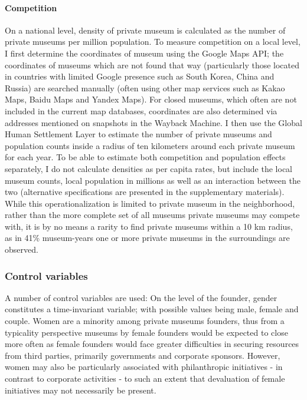 \documentclass[12pt]{article}
\begin{document}
\paragraph*{Competition}

On a national level, density of private museum is calculated as the number of private museums per million population.
To measure competition on a local level, I first determine the coordinates of museum using the Google Maps API; the coordinates of museums which are not found that way (particularly those located in countries with limited Google presence such as South Korea, China and Russia) are searched manually (often using other map services such as Kakao Maps, Baidu Maps and Yandex Maps).
For closed museums, which often are not included in the current map databases, coordinates are also determined via addresses mentioned on snapshots in the Wayback Machine.
I then use the Global Human Settlement Layer \parencite{EC_2023_GHSL} to estimate the number of private museums and population counts inside a radius of ten kilometers around each private museum for each year.
To be able to estimate both competition and population effects separately, I do not calculate densities as per capita rates, but include the local museum counts, local population in millions as well as an interaction between the two (alternative specifications are presented in the supplementary materials).
While this operationalization is limited to private museum in the neighborhood, rather than the more complete set of all museums private museums may compete with, it is by no means a rarity to find private museums within a 10 km radius, as in 41\% museum-years one or more private museums in the surroundings are observed. 
\subsubsection*{Control variables}


\bigbreak
\noindent
A number of control variables are used: 
On the level of the founder, gender constitutes a time-invariant variable; with possible values being male, female and couple.
Women are a minority among private museums founders, thus from a typicality perspective \parencite{Rosch_1975_family} museums by female founders would be expected to close more often as female founders would face greater difficulties in securing resources from third parties, primarily governments and corporate sponsors.
However, women may also be particularly associated with philanthropic initiatives - in contrast to corporate activities \parencite{Milam_2013_artgirls} - to such an extent that devaluation of female initiatives may not necessarily be present.
\end{document}
